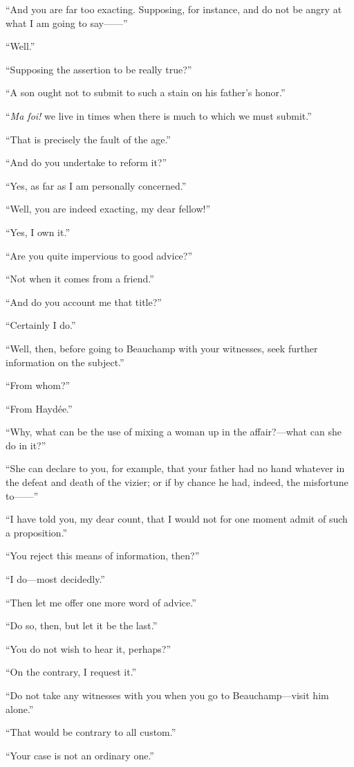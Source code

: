 “And you are far too exacting. Supposing, for instance, and do not be
angry at what I am going to say——”

“Well.”

“Supposing the assertion to be really true?”

“A son ought not to submit to such a stain on his father’s honor.”

“\textit{Ma foi!} we live in times when there is much to which we must
submit.”

“That is precisely the fault of the age.”

“And do you undertake to reform it?”

“Yes, as far as I am personally concerned.”

“Well, you are indeed exacting, my dear fellow!”

“Yes, I own it.”

“Are you quite impervious to good advice?”

“Not when it comes from a friend.”

“And do you account me that title?”

“Certainly I do.”

“Well, then, before going to Beauchamp with your witnesses, seek
further information on the subject.”

“From whom?”

“From Haydée.”

“Why, what can be the use of mixing a woman up in the affair?—what can
she do in it?”

“She can declare to you, for example, that your father had no hand
whatever in the defeat and death of the vizier; or if by chance he had,
indeed, the misfortune to——”

“I have told you, my dear count, that I would not for one moment admit
of such a proposition.”

“You reject this means of information, then?”

“I do—most decidedly.”

“Then let me offer one more word of advice.”

“Do so, then, but let it be the last.”

“You do not wish to hear it, perhaps?”

“On the contrary, I request it.”

“Do not take any witnesses with you when you go to Beauchamp—visit him
alone.”

“That would be contrary to all custom.”

“Your case is not an ordinary one.”

